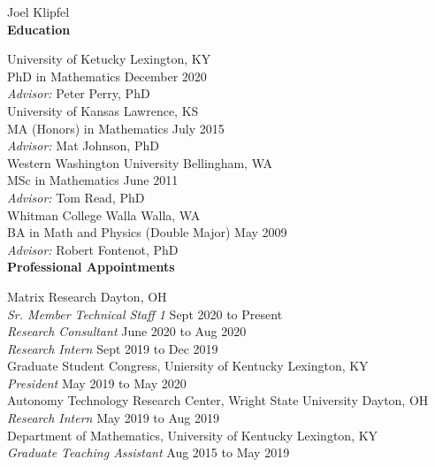 \documentclass[dissertation.tex]{subfiles}
\begin{document}
\noindent Joel Klipfel \\

\noi\textbf{Education}

\noi{}University of Ketucky \hfill Lexington, KY \\
\noi{}PhD in Mathematics \hfill December 2020 \\
\noi\textit{Advisor:} Peter Perry, PhD\\

\noi{}University of Kansas \hfill Lawrence, KS \\
\noi{}MA (Honors) in Mathematics \hfill July 2015 \\
\noi\textit{Advisor:} Mat Johnson, PhD\\

\noi{}Western Washington University \hfill Bellingham, WA\\
\noi{}MSc in Mathematics \hfill June 2011\\
\noi\textit{Advisor:} Tom Read, PhD \\

\noi{}Whitman College \hfill Walla Walla, WA\\
\noi{}BA in Math and Physics (Double Major) \hfill May 2009\\
\noi\textit{Advisor:} Robert Fontenot, PhD \\

\noi\textbf{Professional Appointments}

\noi{}Matrix Research \hfill Dayton, OH \\
\noi{}\textit{Sr. Member Technical Staff 1} \hfill Sept 2020 to Present \\
\noi{}\textit{Research Consultant} \hfill June 2020 to Aug 2020 \\
\noi{}\textit{Research Intern} \hfill Sept 2019 to Dec 2019 \\

\noi{}Graduate Student Congress, Uniersity of Kentucky \hfill Lexington, KY \\
\noi{}\textit{President} \hfill May 2019 to May 2020 \\

\noi{}Autonomy Technology Research Center, Wright State University \hfill Dayton, OH \\
\noi{}\textit{Research Intern} \hfill May 2019 to Aug 2019 \\

\noi{}Department of Mathematics, University of Kentucky \hfill Lexington, KY \\
\noi{}\textit{Graduate Teaching Assistant} \hfill Aug 2015 to May 2019 \\
\end{document}
